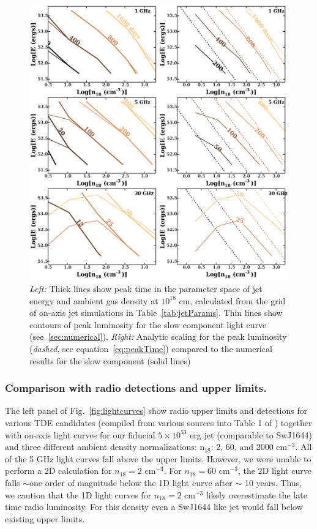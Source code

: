 \documentclass[usenatbib,fleqn]{mnras}
\begin{document}
\begin{figure}
  \includegraphics[width=16cm]{tp_contours_new.pdf}
  \caption{\label{fig:ContoursTp} {\it {Left:}} Thick lines show peak
    time in the parameter space of jet energy and ambient gas density
    at $10^{18}$ cm, calculated from the grid of on-axis jet
    simulations in Table~\ref{tab:jetParams}. Thin lines show contours
    of peak luminosity for the slow component light curve
    (see~\ref{sec:numerical}). {\it Right:} Analytic scaling for the
    peak luminosity ({\it dashed}, see equation~\ref{eq:peakTime})
    compared to the numerical results for the slow component (solid
    lines)}
\end{figure}




\subsubsection{Comparison with radio detections and upper limits.}
The left panel of Fig.~\ref{fig:lightcurves} show radio upper limits
and detections for various TDE candidates (compiled from various
sources into Table 1 of \citealt{Mimica+2015}) together with on-axis
light curves for our fiducial $5\times 10^{53}$ erg jet (comparable to
SwJ1644) and three different ambient density normalizations: n$_{18}$:
2, 60, and 2000 cm$^{-3}$. All of the 5 GHz light curves fall above
the upper limits. However, we were unable to perform a 2D calculation
for $n_{18}=2$ cm$^{-3}$.  For $n_{18}=60$ cm$^{-3}$, the 2D light curve falls
$\sim$one order of magnitude below the 1D light curve after $\sim$ 10
years. Thus, we caution that the 1D light curves for $n_{18}=2$
cm$^{-3}$ likely overestimate the late time radio luminosity. For this
density even a SwJ1644 like jet would fall below existing upper
limits.
\end{document}
